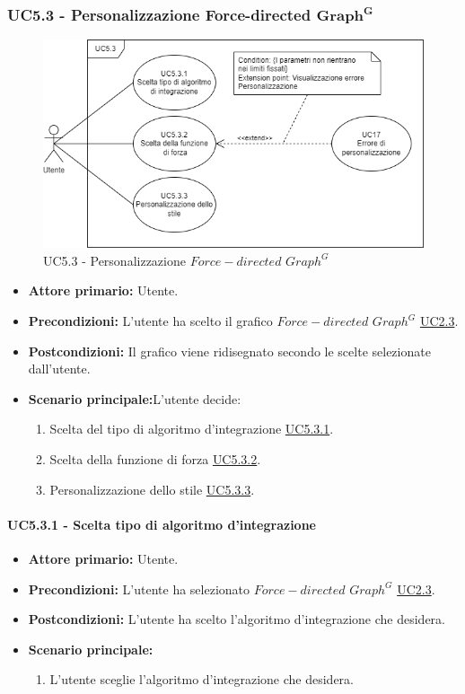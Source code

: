 \subsubsection{UC5.3 - Personalizzazione Force-directed ${\mathbf{Graph^{G}}}$}
\label{sec:UC5.3}
\begin{figure}[h!]
	\centering
	\includegraphics[scale=0.60]{../../assets/personalizzazioneForce-directedGraph.png}
	\caption{UC5.3 - Personalizzazione $Force-directed$ $Graph^{G}$}
\end{figure}
\begin{itemize}
    \item \textbf{Attore primario:} Utente.
	\item \textbf{Precondizioni:} L'utente ha scelto il grafico $Force-directed$ $Graph^{G}$ \hyperref[sec:UC2.3]{UC2.3}.
	\item \textbf{Postcondizioni:} Il grafico viene ridisegnato secondo le scelte selezionate dall'utente.
	\item \textbf{Scenario principale:}L'utente decide:
	\begin{enumerate}
        \item Scelta del tipo di algoritmo d'integrazione \hyperref[sec:UC5.3.1]{UC5.3.1}.
        \item Scelta della funzione di forza \hyperref[sec:UC5.3.2]{UC5.3.2}.
        \item Personalizzazione dello stile \hyperref[sec:UC5.3.3]{UC5.3.3}.
    \end{enumerate}
\end{itemize}
\paragraph{UC5.3.1 - Scelta tipo di algoritmo d'integrazione}
\label{sec:UC5.3.1}
    \begin{itemize}
        \item \textbf{Attore primario:} Utente.
        \item \textbf{Precondizioni:} L'utente ha selezionato $Force-directed$ $Graph^{G}$ \hyperref[sec:UC2.3]{UC2.3}.
	    \item \textbf{Postcondizioni:} L'utente ha scelto l'algoritmo d'integrazione che desidera.
	    \item \textbf{Scenario principale:}
	    \begin{enumerate}
	    		\item L'utente sceglie l'algoritmo d'integrazione che desidera.
		\end{enumerate}
    \end{itemize}
